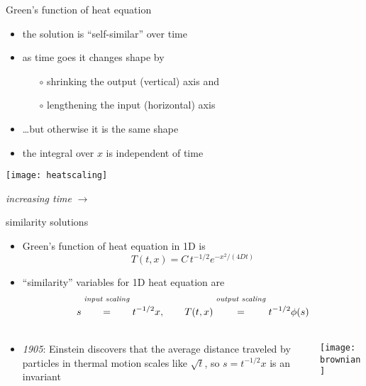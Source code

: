 \begin{frame}{Green's function of heat equation}

\begin{itemize}
\item the solution is ``self-similar'' over time
\item as time goes it changes shape by
  \begin{itemize}
  \item[$\circ$] shrinking the output (vertical) axis and
  \item[$\circ$] lengthening the input (horizontal) axis
  \end{itemize}
\item \dots but otherwise it is the same shape
\item the integral over $x$ is independent of time
\end{itemize}

\begin{center}
\texttt{[image: heatscaling]}

\emph{increasing time} \Large $\to$
\end{center}
\end{frame}


\begin{frame}{similarity solutions}

\begin{itemize}
\item Green's function of heat equation in 1D is
	$$T(t,x) = C\, t^{-1/2} e^{-x^2/(4Dt)}$$
\item ``similarity'' variables for 1D heat equation are
	$$s \stackrel{\text{\emph{input scaling}}}{\phantom{\Big|}=\phantom{\Big|}} t^{-1/2} x, \qquad T(t,x) \stackrel{\text{\emph{output scaling}}}{\phantom{\Big|}=\phantom{\Big|}} t^{-1/2} \phi(s)$$
\end{itemize}
\begin{columns}
\begin{column}{0.6\textwidth}
\begin{itemize}
\item \emph{1905}: Einstein discovers that the average distance traveled by particles in thermal motion scales like $\sqrt{t}$, so $s = t^{-1/2}x$ is an invariant
\end{itemize}
\end{column}
\begin{column}{0.4\textwidth}
\begin{center}
\texttt{[image: brownian]}
\end{center}
\end{column}
\end{columns}

\end{frame}


